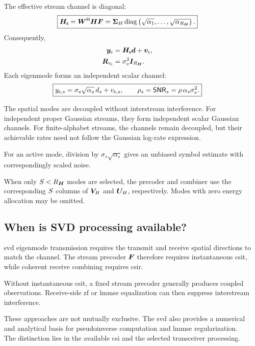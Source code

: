 The effective stream channel is diagonal:
\begin{equation}\label{eq:svd-diagonal}
	\boxed{
		\bm{H}_{\mathsf{s}}
		={\bm{W}}^{\mathsf{H}}\bm{H}\bm{F}
		=\bm{\Sigma}_{H}
		\operatorname{diag}\left(\sqrt{\alpha_1},\ldots,\sqrt{\alpha_{R_{\bm{H}}}}\right).
	}
\end{equation}
Consequently,
\begin{align*}
	\bm{y}_{\mathsf c}
	&=\bm{H}_{\mathsf{s}}\bm{d}+\bm{v}_{\mathsf c},\\
	\bm{R}_{v_{\mathsf c}}
	&=\sigma_v^2\bm{I}_{R_{\bm{H}}}.
\end{align*}
Each eigenmode forms an independent scalar channel:
\begin{equation}\label{eq:parallel}
	\boxed{
		y_{\mathsf c,s}
		=\sigma_s\sqrt{\alpha_s}\,d_s
		+v_{\mathsf c,s},
		\qquad
		\rho_s=\mathsf{SNR}_s
		=\rho\,\alpha_s\sigma_s^2.
	}
\end{equation}

The spatial modes are decoupled without interstream
interference. For independent proper Gaussian streams,
they form independent scalar Gaussian channels.
For finite-alphabet streams, the channels remain
decoupled, but their achievable rates need not follow
the Gaussian log-rate expression.

For an active mode, division by
$\sigma_s\sqrt{\alpha_s}$ gives an unbiased symbol
estimate with correspondingly scaled noise.

When only $S<R_{\bm{H}}$ modes are selected, the precoder
and combiner use the corresponding $S$ columns
of $\bm{V}_{H}$ and $\bm{U}_{H}$, respectively.
Modes with zero energy allocation may be omitted.

\subsection{When is SVD processing available?}

\Ac{svd} eigenmode transmission requires the transmit
and receive spatial directions to match the channel.
The stream precoder $\bm{F}$ therefore requires
instantaneous \ac{csit}, while coherent receive
combining requires \ac{csir}.

Without instantaneous \ac{csit}, a fixed stream
precoder generally produces coupled observations.
Receive-side \ac{zf} or \ac{lmmse} equalization
can then suppress interstream interference.

These approaches are not mutually exclusive.
The \ac{svd} also provides a numerical and analytical
basis for pseudoinverse computation and
\ac{lmmse} regularization. The distinction lies
in the available \ac{csi} and the selected
transceiver processing.

